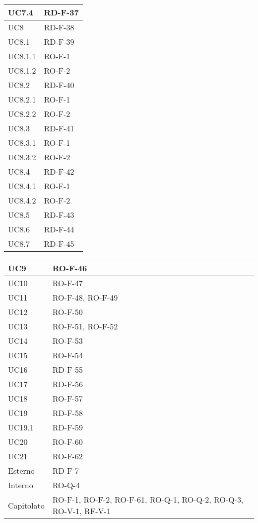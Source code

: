 \begin{center}
\begin{tabular}{ |m{8em}|m{13em}| }
    \hline
    UC7.4       &   RD-F-37 \\
    \hline
    UC8         &   RD-F-38 \\
    \hline
    UC8.1       &   RD-F-39 \\
    \hline
    UC8.1.1     &   RO-F-1 \\
    \hline
    UC8.1.2     &   RO-F-2 \\
    \hline
    UC8.2       &   RD-F-40 \\
    \hline
    UC8.2.1     &   RO-F-1 \\
    \hline
    UC8.2.2     &   RO-F-2 \\
    \hline
    UC8.3       &   RD-F-41 \\
    \hline
    UC8.3.1     &   RO-F-1 \\
    \hline
    UC8.3.2     &   RO-F-2 \\
    \hline
    UC8.4       &   RD-F-42 \\
    \hline
    UC8.4.1     &   RO-F-1 \\
    \hline
    UC8.4.2     &   RO-F-2 \\
    \hline
    UC8.5       &   RD-F-43 \\
    \hline
    UC8.6       &   RD-F-44 \\
    \hline
    UC8.7       &   RD-F-45 \\
    \hline
    \end{tabular}
    \newpage
    \begin{tabular}{ |m{8em}|m{13em}| }
    \hline
    UC9         &   RO-F-46 \\
    \hline
    UC10        &   RO-F-47 \\
    \hline
    UC11        &   RO-F-48, RO-F-49 \\
    \hline
    UC12        &   RO-F-50 \\
    \hline
    UC13        &   RO-F-51, RO-F-52 \\
    \hline
    UC14        &   RO-F-53 \\
    \hline
    UC15        &   RO-F-54 \\
    \hline
    UC16        &   RD-F-55 \\
    \hline
    UC17        &   RD-F-56 \\
    \hline
    UC18        &   RO-F-57 \\
    \hline
    UC19        &   RD-F-58 \\
    \hline
    UC19.1      &   RD-F-59 \\
    \hline
    UC20        &   RO-F-60 \\
    \hline
    UC21        &   RO-F-62 \\
    \hline
    Esterno     &   RD-F-7 \\
    \hline
    Interno     &   RO-Q-4 \\
    \hline
    Capitolato  &   RO-F-1, RO-F-2, RO-F-61, RO-Q-1, RO-Q-2, RO-Q-3, RO-V-1, RF-V-1 \\
    \hline
\end{tabular}
\end{center}
